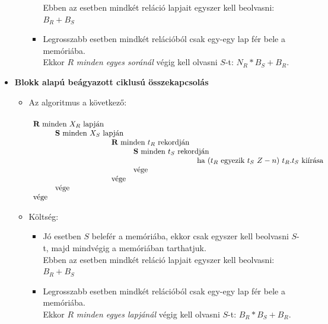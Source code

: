 \documentclass[12pt,margin=0px]{article}
\begin{document}
\begin{itemize}
\begin{itemize}
\begin{itemize}
                        Ebben az esetben mindkét reláció lapjait egyszer kell beolvasni: $B_R + B_S$
                    \item Legrosszabb esetben mindkét relációból csak egy-egy lap fér bele a memóriába.\\
                        Ekkor $R$ \emph{minden egyes soránál} végig kell olvasni $S$-t: $N_R * B_S + B_R$.
                \end{itemize}
			\end{itemize}
			\item	\textbf{Blokk alapú beágyazott ciklusú összekapcsolás}
            \begin{itemize}

            \item Az algoritmus a következő: \\\\
                {\small
                $\begin{array}{llllll}
                    \multicolumn{2}{l}{\textbf{R}\ \text{minden}\ X_{R}\ \text{lapján}} & & & & \\
                   & \multicolumn{2}{l}{\textbf{S}\ \text{minden}\ X_{S}\ \text{lapján}} & & & \\
                   & & \multicolumn{2}{l}{\textbf{R}\ \text{minden}\ t_{R}\ \text{rekordján}} & & \\
                   & & & \multicolumn{2}{l}{\textbf{S}\ \text{minden}\ t_{S}\ \text{rekordján}} & \\
                   & & & & \multicolumn{2}{l}{\text{ha}\ (t_{R}\ \text{egyezik}\ t_{S}\ Z-n)\ t_{R}.t_{S}\ \text{kiírása}} \\
                   & & & \text{vége} & & \\
                   & & \text{vége} & & & \\
                   & \text{vége} & & & & \\
                  \text{vége} & & & & & \\
                \end{array}$}\\
                \item Költség:
                \begin{itemize}
                    \item Jó esetben $S$ belefér a memóriába, ekkor csak egyszer kell beolvasni $S$-t, majd mindvégig a memóriában tarthatjuk.\\
                        Ebben az esetben mindkét reláció lapjait egyszer kell beolvasni: $B_R + B_S$
                    \item Legrosszabb esetben mindkét relációból csak egy-egy lap fér bele a memóriába.\\
                        Ekkor $R$ \emph{minden egyes lapjánál} végig kell olvasni $S$-t: $B_R * B_S + B_R$.
                \end{itemize}
            \end{itemize}
		\end{itemize}
\end{document}
